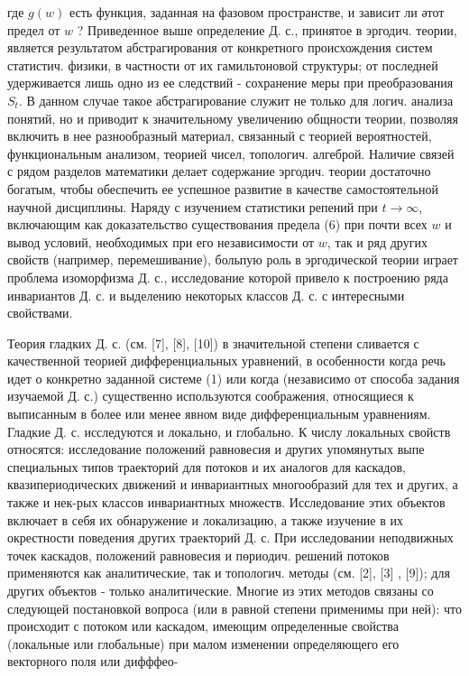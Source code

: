 \documentclass[10pt]{article}
\begin{document}
где $g(w)$ есть функция, заданная на фазовом пространстве, и зависит ли әтот предел от $w$ ? Приведенное выше определение Д. с., принятое в эргодич. теории, является результатом абстрагирования от конкретного происхождения систем статистич. физики, в частности от их гамильтоновой структуры; от последней удерживается лишь одно из ее следствий - сохранение меры при преобразования $S_{t}$. В данном случае такое абстрагирование служит не только для логич. анализа понятий, но и приводит к значительному увеличению общности теории, позволяя включить в нее разнообразный материал, связанный с теорией вероятностей, функциональным анализом, теорией чисел, топологич. алгеброй. Наличие связей с рядом разделов математики делает содержание эргодич. теории достаточно богатым, чтобы обеспечить ее успешное развитие в качестве самостоятельной научной дисциплины. Наряду с изучением статистики репений при $t \rightarrow \infty$, включающим как доказательство существования предела (6) при почти всех $w$ и вывод условий, необходимых при его независимости от $w$, так и ряд других свойств (например, перемешивание), больпую роль в эргодической теории играет проблема изоморфизма Д. с., исследование которой привело к построению ряда инвариантов Д. с. и выделению некоторых классов Д. с. с интересными свойствами.



Теория гладких Д. с. (см. [7], [8], [10]) в значительной степени сливается с качественной теорией дифференциальных уравнений, в особенности когда речь идет о конкретно заданной системе (1) или когда (независимо от способа задания изучаемой Д. с.) существенно используются соображения, относящиеся к выписанным в более или менее явном виде дифференциальным уравнениям. Гладкие Д. с. исследуются и локально, и глобально. К числу локальных свойств относятся: исследование положений равновесия и других упомянутых выпе специальных типов траекторий для потоков и их аналогов для каскадов, квазипериодических движений и инвариантных многообразий для тех и других, а также и нек-рых классов инвариантных множеств. Исследование этих объектов включает в себя их обнаружение и локализацию, а также изучение в их окрестности поведения других траекторий Д. с. При исследовании неподвижных точек каскадов, положений равновесия и пөриодич. решений потоков применяются как аналитические, так и топологич. методы (см. [2], [3] , [9]); для других объектов - только аналитические. Многие из этих методов связаны со следующей постановкой вопроса (или в равной степени применимы при ней): что происходит с потоком или каскадом, имеющим определенные свойства (локальные или глобальные) при малом изменении определяющего его векторного поля или дифффео-
\end{document}
